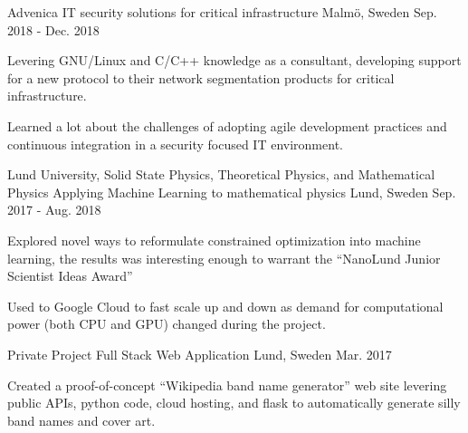 


\begin{cventries}


\cventry
{Advenica} %
{IT security solutions for critical infrastructure} %
{Malmö, Sweden} %
{Sep. 2018 - Dec. 2018} %
{ %
\begin{cvitems}
\item {Levering GNU/Linux and C/C++ knowledge as a consultant, developing support for a new protocol to their network segmentation products for critical infrastructure.}
\item {Learned a lot about the challenges of adopting agile development practices and continuous
integration in a security focused IT environment.}
\end{cvitems}
}

\cventry
{Lund University, Solid State Physics, Theoretical Physics, and Mathematical Physics} %
{Applying Machine Learning to mathematical physics } %
{Lund, Sweden} %
{Sep. 2017 - Aug. 2018} %
{ %
\begin{cvitems}
\item {Explored novel ways to reformulate constrained optimization into
machine learning, the results was interesting enough to warrant the ``NanoLund Junior Scientist Ideas Award''}
\item {Used to Google Cloud to fast scale up and down as demand for
computational power (both CPU and GPU) changed during the project.}
\end{cvitems}
}

\cventry
{Private Project} %
{Full Stack Web Application } %
{Lund, Sweden} %
{Mar. 2017 } %
{ %
\begin{cvitems}
\item {Created a proof-of-concept ``Wikipedia band name generator'' web site
levering public APIs, python code, cloud hosting, and flask to automatically
generate silly band names and cover art.}
\end{cvitems}
}


\end{cventries}
